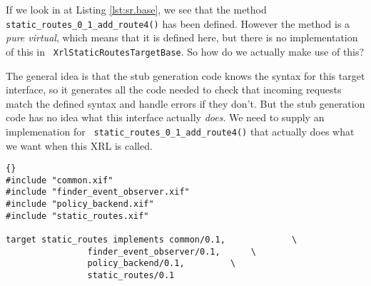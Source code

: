 \documentclass[11pt]{article}
\newcommand{\stt}{\tt\small}
\begin{document}
If we look in at Listing \ref{lst:sr.base}, we see that the method
{\stt static\_routes\_0\_1\_add\_route4()} has been defined.  However the
method is a {\it pure virtual}, which means that it is defined here,
but there is no implementation of this in {\stt
XrlStaticRoutesTargetBase}.  So how do we actually make use of this?

The general idea is that the stub generation code knows the syntax for
this target interface, so it generates all the code needed to check
that incoming requests match the defined syntax and handle errors if
they don't.  But the stub generation code has no idea what this
interface actually {\it does}.  We need to supply an implemenation for {\stt
static\_routes\_0\_1\_add\_route4()} that actually does what we want when
this XRL is called.

\newpage
\begin{lstlisting}[caption={Contents of {\stt
	xorp/xrl/targets/static\_routes.tgt} %
                                     \label{lst:sr.tgt} } ]{}
#include "common.xif"
#include "finder_event_observer.xif"
#include "policy_backend.xif"
#include "static_routes.xif"

target static_routes implements	common/0.1,				\
				finder_event_observer/0.1,		\
				policy_backend/0.1,			\
				static_routes/0.1
\end{lstlisting}
\end{document}
